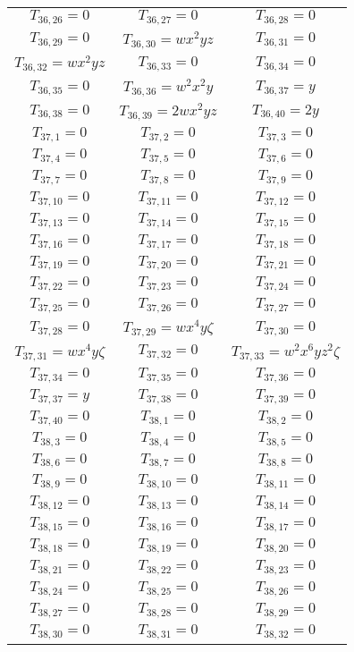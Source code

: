 \documentclass[12pt]{memoireuqam1.3}
\begin{document}
\begin{longtable}{|c|c|c|}
$T_{36,26}= 0$&
$T_{36,27}= 0$&
$T_{36,28}= 0$\\
$T_{36,29}= 0$&
$T_{36,30}= wx^2yz$&
$T_{36,31}= 0$\\
$T_{36,32}= wx^2yz$&
$T_{36,33}= 0$&
$T_{36,34}= 0$\\
$T_{36,35}= 0$&
$T_{36,36}= w^2x^2y$&
$T_{36,37}= y$\\
$T_{36,38}= 0$&
$T_{36,39}= 2wx^2yz$&
$T_{36,40}= 2y$\\
$T_{37,1}= 0$&
$T_{37,2}= 0$&
$T_{37,3}= 0$\\
$T_{37,4}= 0$&
$T_{37,5}= 0$&
$T_{37,6}= 0$\\
$T_{37,7}= 0$&
$T_{37,8}= 0$&
$T_{37,9}= 0$\\
$T_{37,10}= 0$&
$T_{37,11}= 0$&
$T_{37,12}= 0$\\
$T_{37,13}= 0$&
$T_{37,14}= 0$&
$T_{37,15}= 0$\\
$T_{37,16}= 0$&
$T_{37,17}= 0$&
$T_{37,18}= 0$\\
$T_{37,19}= 0$&
$T_{37,20}= 0$&
$T_{37,21}= 0$\\
$T_{37,22}= 0$&
$T_{37,23}= 0$&
$T_{37,24}= 0$\\
$T_{37,25}= 0$&
$T_{37,26}= 0$&
$T_{37,27}= 0$\\
$T_{37,28}= 0$&
$T_{37,29}= wx^4y\zeta$&
$T_{37,30}= 0$\\
$T_{37,31}= wx^4y\zeta$&
$T_{37,32}= 0$&
$T_{37,33}= w^2x^6yz^2\zeta$\\
$T_{37,34}= 0$&
$T_{37,35}= 0$&
$T_{37,36}= 0$\\
$T_{37,37}= y$&
$T_{37,38}= 0$&
$T_{37,39}= 0$\\
$T_{37,40}= 0$&
$T_{38,1}= 0$&
$T_{38,2}= 0$\\
$T_{38,3}= 0$&
$T_{38,4}= 0$&
$T_{38,5}= 0$\\
$T_{38,6}= 0$&
$T_{38,7}= 0$&
$T_{38,8}= 0$\\
$T_{38,9}= 0$&
$T_{38,10}= 0$&
$T_{38,11}= 0$\\
$T_{38,12}= 0$&
$T_{38,13}= 0$&
$T_{38,14}= 0$\\
$T_{38,15}= 0$&
$T_{38,16}= 0$&
$T_{38,17}= 0$\\
$T_{38,18}= 0$&
$T_{38,19}= 0$&
$T_{38,20}= 0$\\
$T_{38,21}= 0$&
$T_{38,22}= 0$&
$T_{38,23}= 0$\\
$T_{38,24}= 0$&
$T_{38,25}= 0$&
$T_{38,26}= 0$\\
$T_{38,27}= 0$&
$T_{38,28}= 0$&
$T_{38,29}= 0$\\
$T_{38,30}= 0$&
$T_{38,31}= 0$&
$T_{38,32}= 0$\\

\end{longtable}
\end{document}
